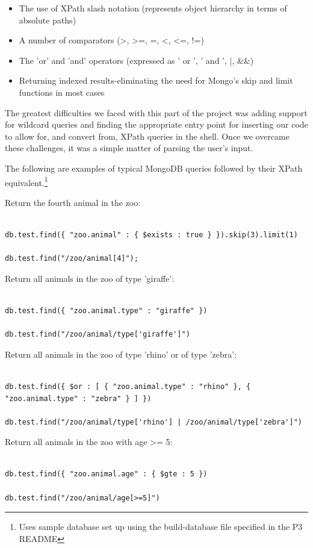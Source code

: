 \documentclass{../dependencies/acm_proc_article-sp}
\begin{document}
\begin{itemize}
  \item	The use of XPath slash notation (represents object hierarchy in terms of absolute paths)
  \item	A number of comparators (>, >=, =, <, <=, !=)
  \item	The 'or' and 'and' operators (expressed as ' or ', ' and ', |, \&\&)
  \item	Returning indexed results-eliminating the need for Mongo's skip and limit functions in most cases
\end{itemize}

The greatest difficulties we faced with this part of the project was adding support for wildcard queries and finding the appropriate entry point for inserting our code to allow for, and convert from, XPath queries in the shell. Once we overcame these challenges, it was a simple matter of parsing the user's input.

The following are examples of typical MongoDB queries followed by their XPath equivalent.\footnote{Uses sample database set up using the build-database file specified in the P3 README}

Return the fourth animal in the zoo:
\begin{lstlisting}

db.test.find({ "zoo.animal" : { $exists : true } }).skip(3).limit(1)

db.test.find("/zoo/animal[4]");
\end{lstlisting}

Return all animals in the zoo of type 'giraffe':
\begin{lstlisting}

db.test.find({ "zoo.animal.type" : "giraffe" })

db.test.find("/zoo/animal/type['giraffe']")
\end{lstlisting}

Return all animals in the zoo of type 'rhino' or of type 'zebra':
\begin{lstlisting}

db.test.find({ $or : [ { "zoo.animal.type" : "rhino" }, { "zoo.animal.type" : "zebra" } ] })

db.test.find("/zoo/animal/type['rhino'] | /zoo/animal/type['zebra']")
\end{lstlisting}

Return all animals in the zoo with age >= 5:
\begin{lstlisting}

db.test.find({ "zoo.animal.age" : { $gte : 5 })

db.test.find("/zoo/animal/age[>=5]")
\end{lstlisting}
\end{document}
